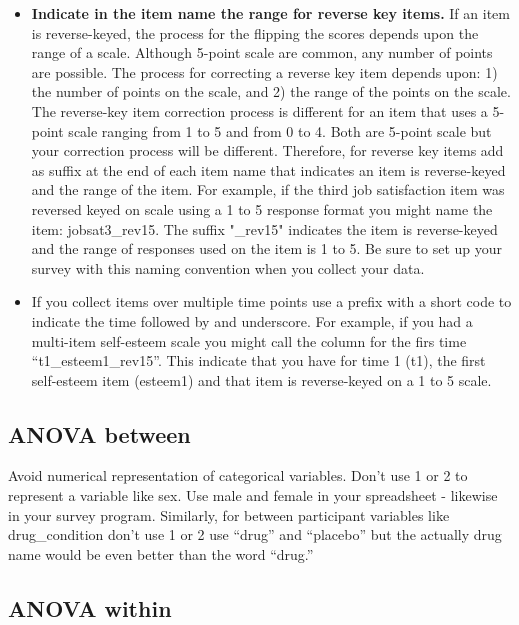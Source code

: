\documentclass[
]{krantz}
\begin{document}
\begin{itemize}
\item
  \textbf{Indicate in the item name the range for reverse key items. } If an item is reverse-keyed, the process for the flipping the scores depends upon the range of a scale. Although 5-point scale are common, any number of points are possible. The process for correcting a reverse key item depends upon: 1) the number of points on the scale, and 2) the range of the points on the scale. The reverse-key item correction process is different for an item that uses a 5-point scale ranging from 1 to 5 and from 0 to 4. Both are 5-point scale but your correction process will be different. Therefore, for reverse key items add as suffix at the end of each item name that indicates an item is reverse-keyed and the range of the item. For example, if the third job satisfaction item was reversed keyed on scale using a 1 to 5 response format you might name the item: jobsat3\_rev15. The suffix "\_rev15" indicates the item is reverse-keyed and the range of responses used on the item is 1 to 5. Be sure to set up your survey with this naming convention when you collect your data.
\item
  If you collect items over multiple time points use a prefix with a short code to indicate the time followed by and underscore. For example, if you had a multi-item self-esteem scale you might call the column for the firs time ``t1\_esteem1\_rev15''. This indicate that you have for time 1 (t1), the first self-esteem item (esteem1) and that item is reverse-keyed on a 1 to 5 scale.
\end{itemize}

\hypertarget{anova-between}{%
\subsection{ANOVA between}\label{anova-between}}

Avoid numerical representation of categorical variables. Don't use 1 or 2 to represent a variable like sex. Use male and female in your spreadsheet - likewise in your survey program. Similarly, for between participant variables like drug\_condition don't use 1 or 2 use ``drug'' and ``placebo'' but the actually drug name would be even better than the word ``drug.''

\hypertarget{anova-within}{%
\subsection{ANOVA within}\label{anova-within}}
\end{document}
